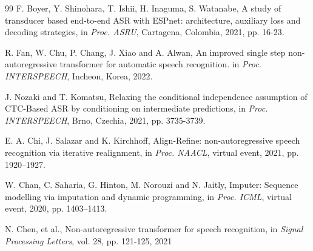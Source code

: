 \documentclass[runningheads]{llncs}
\begin{document}
\begin{thebibliography}{99}
 F. Boyer, Y. Shinohara, T. Ishii, H. Inaguma, S. Watanabe, A study of transducer based end-to-end ASR with ESPnet: architecture, auxiliary loss and decoding strategies, in {\em Proc. ASRU}, Cartagena, Colombia, 2021, pp. 16-23.

 R. Fan, W. Chu, P. Chang, J. Xiao and A. Alwan, An improved single step non-autoregressive transformer for automatic speech recognition. in {\em Proc. INTERSPEECH}, Incheon, Korea, 2022.

 J. Nozaki and T. Komatsu, Relaxing the conditional independence assumption of CTC-Based ASR by conditioning on intermediate predictions, in {\em Proc. INTERSPEECH}, Brno, Czechia, 2021, pp. 3735-3739.

 E. A. Chi, J. Salazar and K. Kirchhoff, Align-Refine: non-autoregressive speech recognition via iterative realignment, in {\em Proc. NAACL}, virtual event, 2021, pp. 1920–1927.

 W. Chan, C. Saharia, G. Hinton, M. Norouzi and N. Jaitly, Imputer: Sequence modelling via imputation and dynamic programming, in {\em Proc. ICML}, virtual event, 2020, pp. 1403–1413.

 N. Chen, et al., Non-autoregressive transformer for speech recognition, in {\em Signal Processing Letters}, vol. 28, pp. 121-125, 2021

\end{thebibliography}
\end{document}

